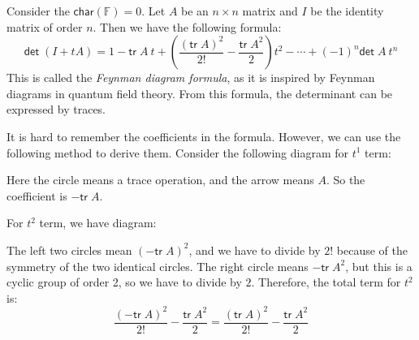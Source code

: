 \documentclass[
	11pt, %
	fleqn, %
	a4paper, %
]{LegrandOrangeBook}
\newcommand{\F}{\mathbb{F}} %
\newcommand{\chart}{\mathsf{char}} %
\renewcommand{\det}{\mathsf{det\;}} %
\newcommand{\tr}{\mathsf{tr\;}} %
\begin{document}
Consider the $\chart(\F) = 0$. Let $A$ be an $n \times n$ matrix and $I$ be the identity matrix of order $n$. Then we have the following formula:
\[
    \det (I + tA) = 1 - \tr A \ t + \left(\frac{(\tr A)^2}{2!} - \frac{\tr A^2}{2}\right) t^2 - \cdots + (-1)^n \det A \ t^n
\]
This is called the \emph{Feynman diagram formula}, as it is inspired by Feynman diagrams in quantum field theory. From this formula, the determinant can be expressed by traces.

It is hard to remember the coefficients in the formula. However, we can use the following method to derive them. Consider the following diagram for $t^1$ term:
\begin{center}
\end{center}
Here the circle means a trace operation, and the arrow means $A$. So the coefficient is $- \tr A$. 

For $t^2$ term, we have diagram:
\begin{center}
\end{center}
The left two circles mean $(- \tr A)^2$, and we have to divide by $2!$ because of the symmetry of the two identical circles. The right circle means $- \tr A^2$, but this is a cyclic group of order 2, so we have to divide by $2$. Therefore, the total term for $t^2$ is:
\[
    \frac{(- \tr A)^2}{2!} - \frac{\tr A^2}{2} = \frac{(\tr A)^2}{2!} - \frac{\tr A^2}{2}
\]
\end{document}
